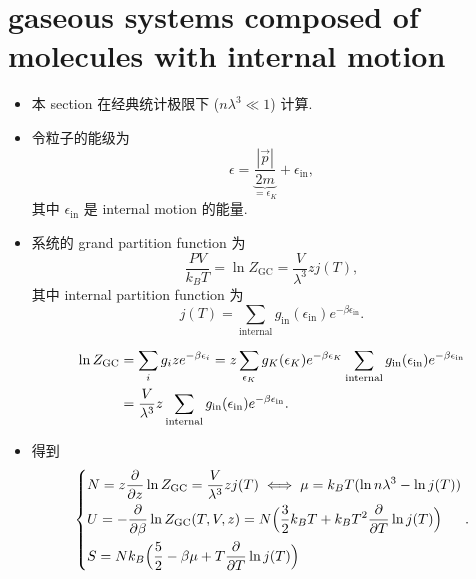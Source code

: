 \section{gaseous systems composed of molecules with internal motion} \label{6.4}
\begin{itemize}
	\item 本 section 在经典统计极限下 ($n \lambda^3 \ll 1$) 计算.
	
	\item 令粒子的能级为
	\begin{equation}
		\epsilon = \underbrace{\frac{|\vec{p}|}{2 m}}_{= \epsilon_K} + \epsilon_\text{in},
	\end{equation}
	其中 $\epsilon_\text{in}$ 是 internal motion 的能量.
	
	\item 系统的 grand partition function 为
	\begin{equation}
		\frac{P V}{k_B T} = \ln Z_\text{GC} = \frac{V}{\lambda^3} z j(T),
	\end{equation}
	其中 internal partition function 为
	\begin{equation}
		j(T) = \sum_\text{internal} g_\text{in}(\epsilon_\text{in}) e^{- \beta \epsilon_\text{in}}.
	\end{equation}
	
	\begin{tcolorbox}[title=calculation:]
		\begin{align}
			\ln Z_\text{GC} &= \sum_i g_i z e^{- \beta \epsilon_i} = z \sum_{\epsilon_K} g_K(\epsilon_K) e^{- \beta \epsilon_K} \sum_\text{internal} g_\text{in}(\epsilon_\text{in}) e^{- \beta \epsilon_\text{in}} \notag \\
			&= \frac{V}{\lambda^3} z \sum_\text{internal} g_\text{in}(\epsilon_\text{in}) e^{- \beta \epsilon_\text{in}}.
		\end{align}
	\end{tcolorbox}
	
	\item 得到
	\begin{equation}
		\begin{dcases}
			N = z \frac{\partial}{\partial z} \ln Z_\text{GC} = \frac{V}{\lambda^3} z j(T) \iff \mu = k_B T (\ln n \lambda^3 - \ln j(T)) \\
			U = - \frac{\partial}{\partial \beta} \ln Z_\text{GC}(T, V, z) = N \Big( \frac{3}{2} k_B T + k_B T^2 \frac{\partial}{\partial T} \ln j(T) \Big) \\
			S = N k_B \Big( \frac{5}{2} - \beta \mu + T \frac{\partial}{\partial T} \ln j(T) \Big)
		\end{dcases}.
	\end{equation}
	

\end{itemize}
